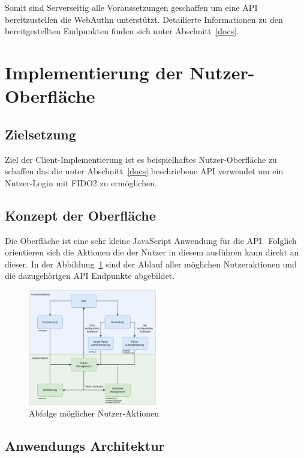 \documentclass[journal]{IEEEtran}
\begin{document}
Somit sind Serverseitig alle Voraussetzungen geschaffen um eine API
bereitzustellen die WebAuthn unterstützt. Detailierte Informationen zu den
bereitgestellten Endpunkten finden sich unter Abschnitt~\ref{docs}.

\section{Implementierung der Nutzer-Oberfläche}

\subsection{Zielsetzung}

Ziel der Client-Implementierung ist es beispielhaftes Nutzer-Oberfläche zu
schaffen das die unter Abschnitt~\ref{docs} beschriebene API verwendet um ein
Nutzer-Login mit FIDO2 zu ermöglichen.

\subsection{Konzept der Oberfläche}

Die Oberfläche ist eine sehr kleine JavaScript Anwendung für die API.\ Folglich
orientieren sich die Aktionen die der Nutzer in diesem ausführen kann direkt an
dieser. In der Abbildung~\ref{fig:ui-flow} sind der Ablauf aller möglichen
Nutzeraktionen und die dazugehörigen API Endpunkte abgebildet.

\begin{figure}[ht]
	\includegraphics[width=0.5\textwidth]{ui-flow.png}
	\centering
	\caption{Abfolge möglicher Nutzer-Aktionen}\label{fig:ui-flow}
\end{figure}

\subsection{Anwendungs Architektur}
\end{document}
